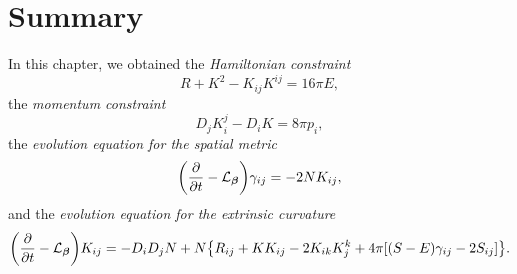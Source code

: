 \section{Summary}
In this chapter, we obtained
the \emph{Hamiltonian constraint}
\begin{equation}
	\label{eq:hamiltonian_constraint}
	R+K^2-K_{ij}K^{ij} = 16\pi E,
\end{equation}
the \emph{momentum constraint}
\begin{equation}
	\label{eq:momentum_constraint}
	D_j K^j_i - D_i K = 8 \pi p_i,
\end{equation}
the \emph{evolution equation for the spatial metric}
\begin{equation}
	\label{eq:evolution_spatial}
\qty(\pdv{t} - \mathcal{L}_{\bm{\beta}})\gamma_{ij} = -2NK_{ij},
\end{equation}
and the \emph{evolution equation for the extrinsic curvature}
\begin{equation}
	\label{eq:evoultion_extrinsic}
	\qty(\pdv{t} - \mathcal{L}_{\bm{\beta}})K_{ij} = -D_i D_j N + N\qty{ R_{ij} + KK_{ij} - 2K_{ik}K^k_j +4\pi \qty[(S-E)\gamma_{ij}-2S_{ij}]}.
\end{equation}



